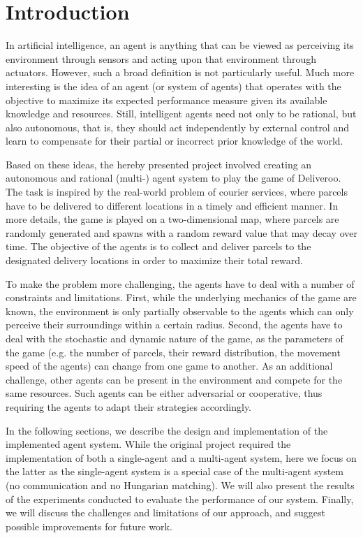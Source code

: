 \section{Introduction}

In artificial intelligence, an agent is anything that can be viewed as perceiving its environment through sensors and acting upon that environment through actuators. However, such a broad definition is not particularly useful. Much more interesting is the idea of an agent (or system of agents) that operates with the objective to maximize its expected performance measure given its available knowledge and resources. Still, intelligent agents need not only to be rational, but also autonomous, that is, they should act independently by external control and learn to compensate for their partial or incorrect prior knowledge of the world.

Based on these ideas, the hereby presented project involved creating an autonomous and rational (multi-) agent system to play the game of Deliveroo. The task is inspired by the real-world problem of courier services, where parcels have to be delivered to different locations in a timely and efficient manner. In more details, the game is played on a two-dimensional map, where parcels are randomly generated and spawns with a random reward value that may decay over time. The objective of the agents is to collect and deliver parcels to the designated delivery locations in order to maximize their total reward.

To make the problem more challenging, the agents have to deal with a number of constraints and limitations. First, while the underlying mechanics of the game are known, the environment is only partially observable to the agents which can only perceive their surroundings within a certain radius. Second, the agents have to deal with the stochastic and dynamic nature of the game, as the parameters of the game (e.g. the number of parcels, their reward distribution, the movement speed of the agents) can change from one game to another. As an additional challenge, other agents can be present in the environment and compete for the same resources. Such agents can be either adversarial or cooperative, thus requiring the agents to adapt their strategies accordingly.

In the following sections, we describe the design and implementation of the implemented agent system. While the original project required the implementation of both a single-agent and a multi-agent system, here we focus on the latter as the single-agent system is a special case of the multi-agent system (no communication and no Hungarian matching). We will also present the results of the experiments conducted to evaluate the performance of our system. Finally, we will discuss the challenges and limitations of our approach, and suggest possible improvements for future work.